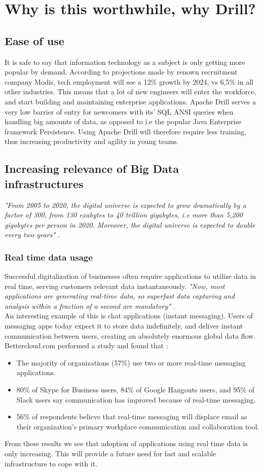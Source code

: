 \documentclass[a4paper,english]{report}
\begin{document}
		\section{Why is this worthwhile, why Drill?}
		\label{sec:why_drill}
			\subsection{Ease of use}It is safe to say that information technology as a subject is only getting more popular by demand. According to projections made by renown recruitment company Modis, tech employment will see a 12\% growth by 2024, vs 6,5\% in all other industries\cite{modis}. This means that a lot of new engineers will enter the workforce, and start building and maintaining enterprise applications. Apache Drill serves a very low barrier of entry for newcomers with its' SQL ANSI queries when handling big amounts of data, as opposed to i.e the popular Java Enterprise framework Persistence. Using Apache Drill will therefore require less training, thus increasing productivity and agility in young teams.
			\subsection{Increasing relevance of Big Data infrastructures}
			\label{big_data}
			\textit{"From 2005 to 2020, the digital universe is expected to grow dramatically by a factor of 300, from 130 exabytes to 40 trillion gigabytes, i.e more than 5,200 gigabytes per person in 2020. Moreover, the digital universe is expected to double every two years"} \cite{bigdata}.
				\subsubsection{Real time data usage}
				Successful digitalization of businesses often require applications to utilize data in real time, serving customers relevant data instantaneously. \textit{"Now, most applications are generating real-time data, so superfast data capturing and analysis within a fraction of a second are mandatory"} \cite{management_analytics}.
				\\
				An interesting example of this is chat applications (instant messaging). Users of messaging apps today expect it to store data indefinitely, and deliver instant communication between users, creating an absolutely enormous global data flow. Bettercloud.com performed a study and found that \cite{bettercloud}:
				\begin{itemize}
					\item The majority of organizations (57\%) use two or more real-time messaging applications.
					\item 80\% of Skype for Business users, 84\% of Google Hangouts users, and 95\% of Slack users say communication has improved because of real-time messaging.
					\item 56\% of respondents believe that real-time messaging will displace email as their organization’s primary workplace communication and collaboration tool.
				\end{itemize}
				From these results we see that adoption of applications using real time data is only increasing. This will provide a future need for fast and scalable infrastructure to cope with it. 
\end{document}
